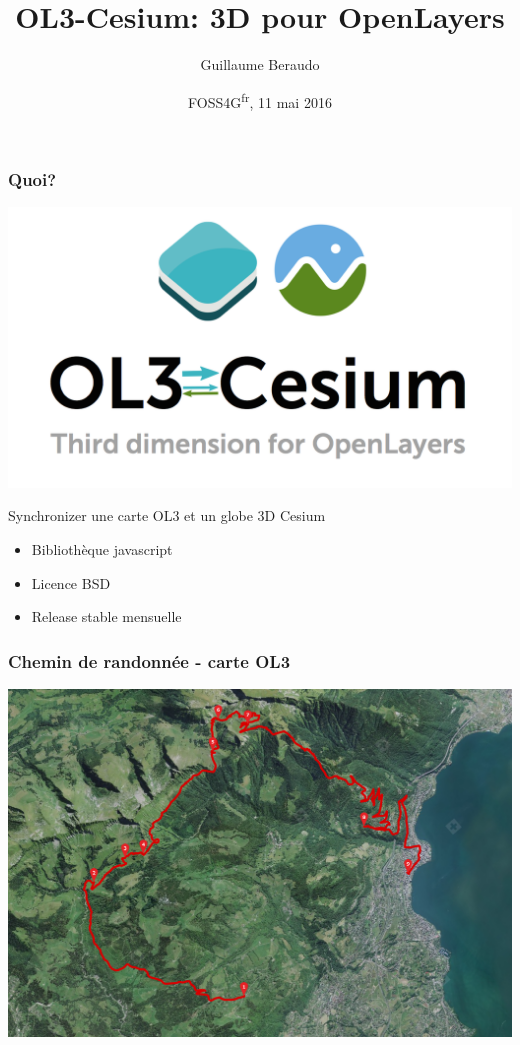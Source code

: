 \documentclass{beamer}
\title{OL3-Cesium: 3D pour OpenLayers}
\author{Guillaume Beraudo}
\institute{Ingénieur Opensource \\Camptocamp, Suisse}
\date{FOSS4G\textsuperscript{fr}, 11 mai 2016}
\begin{document}
  \begin{frame}
    \titlepage
  \end{frame}

  \begin{frame}
       \frametitle{Quoi?}
    \begin{center}
        \includegraphics[width=.3\linewidth]{./ol3-cesium-wide_arrows.png}
    \end{center}

      Synchronizer une carte OL3 et un globe 3D Cesium
      \begin{itemize}
      	\item Bibliothèque javascript
      	\item Licence BSD
      	\item Release stable mensuelle
      \end{itemize}
  \end{frame}


  \begin{frame}
    \frametitle{Chemin de randonnée - carte OL3}
		\begin{center}
		  \includegraphics[width=1.0 \linewidth]{./vtt_2d.png}
		\end{center}
  \end{frame}
\end{document}
